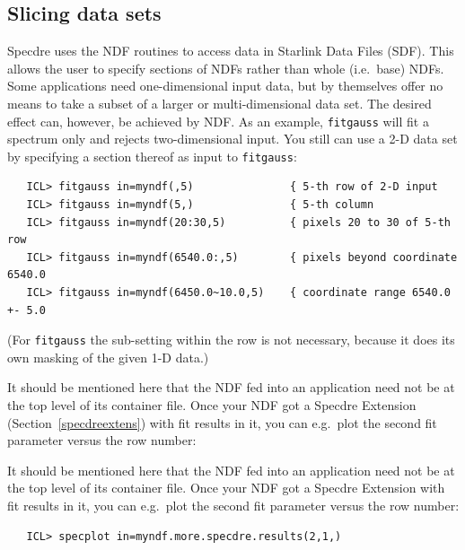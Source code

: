 \documentclass[11pt,twoside]{article}
\newenvironment{latexonly}{}{}
\newcommand{\htmlref}[2]{#1}
\newcommand{\xref}[3]{#1}
\newcommand{\xlabel}[1]{}
\begin{document}

\subsection{\label{specdreslice}\xlabel{specdreslice}Slicing data sets}

   Specdre uses the \xref{NDF routines to access data}{sun33}{}
   in Starlink Data Files (SDF). This allows the user to specify
   sections of NDFs rather than whole (i.e.\ base) NDFs. Some
   applications need one-dimensional input data, but by themselves offer
   no means to take a subset of a larger or multi-dimensional data
   set. The desired effect can, however, be achieved by NDF. As an
   example, {\tt fitgauss} will fit a spectrum only and rejects
   two-dimensional input. You still can use a 2-D data set by specifying
   a section thereof as input to {\tt fitgauss}:

\begin{verbatim}
   ICL> fitgauss in=myndf(,5)               { 5-th row of 2-D input
   ICL> fitgauss in=myndf(5,)               { 5-th column
   ICL> fitgauss in=myndf(20:30,5)          { pixels 20 to 30 of 5-th row
   ICL> fitgauss in=myndf(6540.0:,5)        { pixels beyond coordinate 6540.0
   ICL> fitgauss in=myndf(6450.0~10.0,5)    { coordinate range 6540.0 +- 5.0
\end{verbatim}

   (For {\tt fitgauss} the sub-setting within the row is not necessary,
   because it does its own masking of the given 1-D data.)

\begin{latexonly}
   It should be mentioned here that the NDF fed into an application need
   not be at the top level of its container file. Once your NDF got a
   Specdre Extension
(Section~\ref{specdreextens})
   with fit results in it, you can e.g.\ plot the second fit parameter
   versus the row number:
\end{latexonly}
\begin{htmlonly}
   It should be mentioned here that the NDF fed into an application need
   not be at the top level of its container file. Once your NDF got a
\htmlref{Specdre Extension}{specdreextens}
   with fit results in it, you can e.g.\ plot the second fit parameter
   versus the row number:
\end{htmlonly}

\begin{verbatim}
   ICL> specplot in=myndf.more.specdre.results(2,1,)
\end{verbatim}
\end{document}
